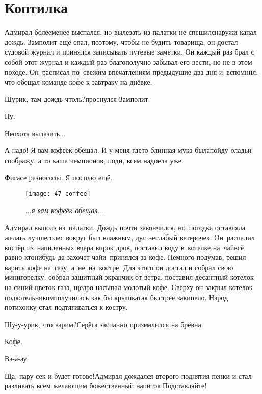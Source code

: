 \chapter{Коптилка}
\vepsianrose

Адмирал более\sdash менее выспался, но вылезать из палатки не спешил\mdash снаружи капал дождь. Замполит ещё спал, поэтому, чтобы не будить товарища, он достал судовой журнал и принялся записывать путевые заметки. Он каждый раз брал с собой этот журнал и каждый раз благополучно забывал его вести, но не в этом походе. Он~расписал по~свежим впечатлениям предыдущие два дня и~вспомнил, что обещал команде кофе к завтраку на днёвке.

\diagdash Шурик, там дождь чтоль?\mdash проснулся Замполит.

\diagdash Ну.

\diagdash Неохота вылазить$\ldots$

\diagdash А надо! Я вам кофеёк обещал. И у меня где\sdash то блинная мука была\mdash пойду оладьи соображу, а то каша чемпионов, поди, всем надоела уже.

\diagdash Фигасе разносолы. Я посплю ещё.

\newpage
\begin{wrapfigure}[13]{l}{0.5\textwidth}
	\centering
	\texttt{[image: 47\_coffee]}
	\caption{\small\textit{...я вам кофеёк обещал...}}
\end{wrapfigure}
Адмирал выполз из~палатки. Дождь почти закончился, но~погодка оставляла желать лучшего\mdash лес вокруг был влажным, дул неслабый ветерочек. Он~распалил костёр из~напиленных вчера впрок дров, поставил воду в~котелке на~чай\mdash всё равно кто\sdash нибудь да захочет чай\mdash и~принялся за кофе. Немного подумав, решил варить кофе на~газу, а~не~на~костре. Для этого он достал и собрал свою мини\sdash горелку, собрал защитный экранчик от ветра, поставил десантный котелок на синий цветок газа, щедро насыпал молотый кофе. Сверху он закрыл котелок подкотельником\mdash получилась как бы крышка\mdash так быстрее закипело. Народ потихонку стал подтягиваться к костру.

\diagdash Шу-у-урик, что варим?\mdash Серёга заспанно приземлился на брёвна.

\diagdash Кофе.

\diagdash Ва-а-ау.

\diagdash Ща, пару сек и будет готово!\mdash Адмирал дождался второго поднятия пенки и стал разливать всем желающим божественный напиток.\mdash Подставляйте!


